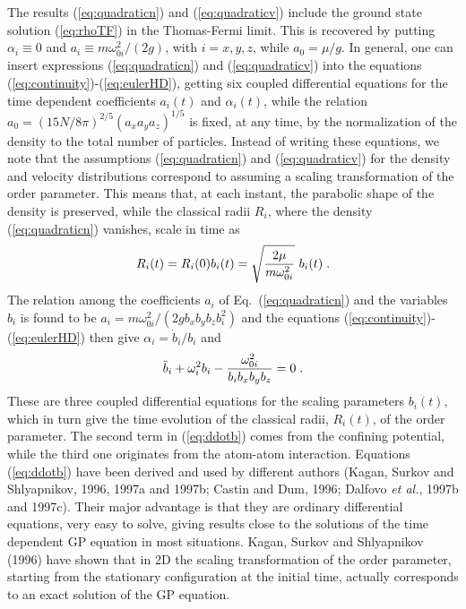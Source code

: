 The results (\ref{eq:quadraticn}) and (\ref{eq:quadraticv}) include
the ground state solution (\ref{eq:rhoTF}) in the Thomas-Fermi limit.
This is recovered by putting 
$\alpha_i \equiv 0$ and $a_i \equiv m\omega_{0i}^2/(2g)$, with 
$i=x,y,z$, while $a_0=\mu/g$. In general, one can insert  
expressions (\ref{eq:quadraticn}) and (\ref{eq:quadraticv}) into
the equations (\ref{eq:continuity})-(\ref{eq:eulerHD}),
getting six coupled differential equations for the time dependent
coefficients $a_i(t)$ and $\alpha_i(t)$, while the relation 
$a_0=(15N/8\pi)^{2/5} (a_x a_y a_z)^{1/5}$ is fixed, at any time, 
by the normalization of the density to the total number of particles. 
Instead of writing these equations, we note that the assumptions 
(\ref{eq:quadraticn}) and (\ref{eq:quadraticv}) for the density and 
velocity distributions correspond to assuming a scaling transformation 
of the order parameter. This means that, at each instant, the parabolic 
shape of the density is preserved, while the classical radii $R_i$, where 
the density (\ref{eq:quadraticn}) vanishes, scale in time as
\begin{equation}
R_i(t) = R_i(0) b_i(t) = \sqrt{ {2 \mu \over m \omega_{0i}^2} }
\  b_i(t) \; . 
\label{eq:scalingr}
\end{equation}
The relation among the coefficients $a_i$ of Eq.~(\ref{eq:quadraticn})
and the variables $b_i$ is found to be $a_i= m \omega_{0i}^2 / ( 2g  
b_x b_y b_z b_i^2)$ and the equations 
(\ref{eq:continuity})-(\ref{eq:eulerHD}) then give $\alpha_i = \dot{b}_i/b_i$ 
and
\begin{equation}
\ddot{b}_i + \omega_i^2 b_i - { \omega_{0i}^2 \over b_ib_xb_yb_z } = 0
\; . 
\label{eq:ddotb}
\end{equation}
These are three  coupled differential equations for the scaling 
parameters $b_i(t)$, which in turn give the time evolution of the 
classical radii, $R_i(t)$, of the order parameter. The second term in 
(\ref{eq:ddotb}) comes from the confining potential, while the third 
one originates from the atom-atom interaction.
Equations (\ref{eq:ddotb}) have been derived and used by different 
authors (Kagan, Surkov and Shlyapnikov, 1996, 1997a and 1997b; Castin 
and Dum, 1996; Dalfovo {\it et al.}, 1997b and 1997c).  Their major
advantage is that they are ordinary differential equations, very easy
to solve, giving results close to the solutions of the time
dependent GP equation in most situations. Kagan, Surkov and 
Shlyapnikov (1996) have shown that in 2D the scaling transformation
of the order parameter, starting from the stationary configuration 
at the initial time, actually corresponds to an exact solution of 
the GP equation. 

